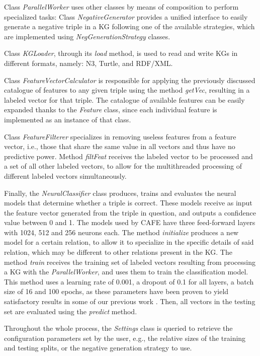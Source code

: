 Class \textit{ParallelWorker} uses other classes by means of composition to perform specialized tasks: Class \textit{NegativeGenerator} provides a unified interface to easily generate a negative triple in a KG following one of the available strategies, which are implemented using \textit{NegGenerationStrategy} classes.

Class \textit{KGLoader}, through its \textit{load} method, is used to read and write KGs in different formats, namely: N3, Turtle, and RDF/XML.

Class \textit{FeatureVectorCalculator} is responsible for applying the previously discussed catalogue of features to any given triple using the method \textit{getVec}, resulting in a labeled vector for that triple. The catalogue of available features can be easily expanded thanks to the \textit{Feature} class, since each individual feature is implemented as an instance of that class.

Class \textit{FeatureFilterer} specializes in removing useless features from a feature vector, i.e., those that share the same value in all vectors and thus have no predictive power. Method \textit{filtFeat} receives the labeled vector to be processed and a set of all other labeled vectors, to allow for the multithreaded processing of different labeled vectors simultaneously.

Finally, the \textit{NeuralClassifier} class produces, trains and evaluates the neural models that determine whether a triple is correct. These models receive as input the feature vector generated from the triple in question, and outputs a confidence value between 0 and 1. The models used by CAFE have three feed-forward layers with 1024, 512 and 256 neurons each. The method \textit{initialize} produces a new model for a certain relation, to allow it to specialize in the specific details of said relation, which may be different to other relations present in the KG. The method \textit{train} receives the training set of labeled vectors resulting from processing a KG with the \textit{ParallelWorker}, and uses them to train the classification model. This method uses a learning rate of 0.001, a dropout of 0.1 for all layers, a batch size of 16 and 100 epochs, as these parameters have been proven to yield satisfactory results in some of our previous work \cite{borrego2021}. Then, all vectors in the testing set are evaluated using the \textit{predict} method.

Throughout the whole process, the \textit{Settings} class is queried to retrieve the configuration parameters set by the user, e.g., the relative sizes of the training and testing splits, or the negative generation strategy to use.

